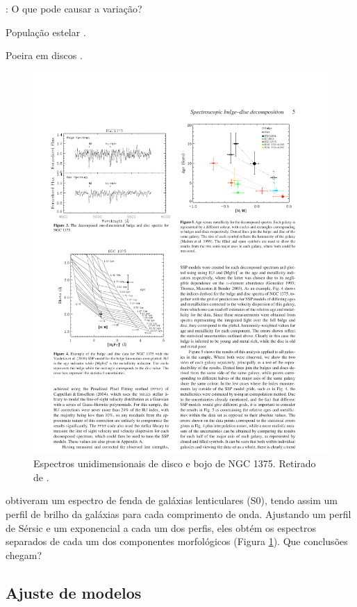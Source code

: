 \TODO: O que pode causar a variação?

População estelar \citep{LaBarbera2009}.

Poeira em discos \citep{Mollenhoff2006}.

\begin{figure}
	\includegraphics{figuras/johnston-spectra}
	\caption[Espectros das componentes morfológicas] {Espectros unidimensionais de
	disco e bojo de NGC 1375. Retirado de \citet{Johnston2012}.}
	\label{fig:spectraJohnston}
\end{figure}

\citet{Johnston2012} obtiveram um espectro de fenda de galáxias lenticulares
(S0), tendo assim um perfil de brilho da galáxias para cada comprimento de onda.
Ajustando um perfil de Sérsic e um exponencial a cada um dos perfis, eles obtém
os espectros separados de cada um dos componentes morfológicos (Figura
\ref{fig:spectraJohnston}). \TODO Que conclusões chegam?


\subsection{Ajuste de modelos}


